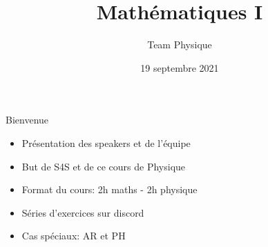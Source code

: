 \documentclass[xcolor=table]{beamer}
\title[Physique]{Mathématiques I} %
\author{Team Physique} %
\institute[S4S] %
{
Initiative Students4Students\\ %
\medskip
}
\date{19 septembre 2021} %
\begin{document}
\begin{frame}
\titlepage %
\end{frame}

\begin{frame}{Bienvenue} %
    \begin{itemize}
        \item Présentation des speakers et de l'équipe
        \item But de S4S et de ce cours de Physique
        \item Format du cours: 2h maths - 2h physique
        \item Séries d'exercices sur discord
        \item Cas spéciaux: AR et PH
        

    \end{itemize}
\end{frame}
    
\end{document}
